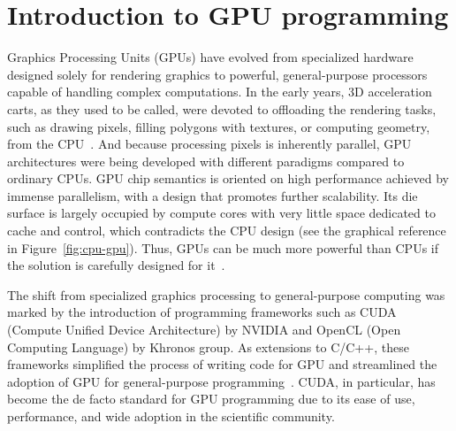 \section{Introduction to GPU programming}
\label{sec:gpu_intro}


Graphics Processing Units (GPUs) have evolved from specialized hardware designed solely for rendering graphics to powerful, general-purpose processors capable of handling complex computations. In the early years, 3D acceleration carts, as they used to be called, were devoted to offloading the rendering tasks, such as drawing pixels, filling polygons with textures, or computing geometry, from the CPU~\cite{pratx2011gpu}. And because processing pixels is inherently parallel, GPU architectures were being developed with different paradigms compared to ordinary CPUs. GPU chip semantics is oriented on high performance achieved by immense parallelism, with a design that promotes further scalability. Its die surface is largely occupied by compute cores with very little space dedicated to cache and control, which contradicts the CPU design (see the graphical reference in Figure~\ref{fig:cpu-gpu}). Thus, GPUs can be much more powerful than CPUs if the solution is carefully designed for it~\cite{navarro2014survey}.

The shift from specialized graphics processing to general-purpose computing was marked by the introduction of programming frameworks such as CUDA (Compute Unified Device Architecture) by NVIDIA and OpenCL (Open Computing Language) by Khronos group. As extensions to C/C++, these frameworks simplified the process of writing code for GPU and streamlined the adoption of GPU for general-purpose programming~\cite{croix2009introduction}. CUDA, in particular, has become the de facto standard for GPU programming due to its ease of use, performance, and wide adoption in the scientific community.

